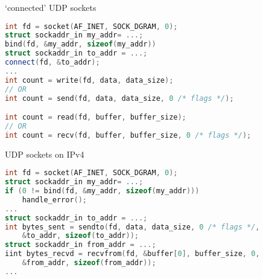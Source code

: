 
\begin{frame}[fragile]{`connected' UDP sockets}
\begin{lstlisting}[language=C++,style=smaller]
int fd = socket(AF_INET, SOCK_DGRAM, 0);
struct sockaddr_in my_addr= ...;
bind(fd, &my_addr, sizeof(my_addr))
struct sockaddr_in to_addr = ...;
connect(fd, &to_addr);
...
int count = write(fd, data, data_size);
// OR
int count = send(fd, data, data_size, 0 /* flags */);

int count = read(fd, buffer, buffer_size);
// OR
int count = recv(fd, buffer, buffer_size, 0 /* flags */);
\end{lstlisting}
\end{frame}

\begin{frame}[fragile]{UDP sockets on IPv4}
\begin{lstlisting}[language=C++,style=smaller]
int fd = socket(AF_INET, SOCK_DGRAM, 0);
struct sockaddr_in my_addr= ...;
if (0 != bind(fd, &my_addr, sizeof(my_addr)))
    handle_error();
...
struct sockaddr_in to_addr = ...;
int bytes_sent = sendto(fd, data, data_size, 0 /* flags */,
    &to_addr, sizeof(to_addr));
struct sockaddr_in from_addr = ...;
iint bytes_recvd = recvfrom(fd, &buffer[0], buffer_size, 0,
    &from_addr, sizeof(from_addr));
...
\end{lstlisting}
\end{frame}
